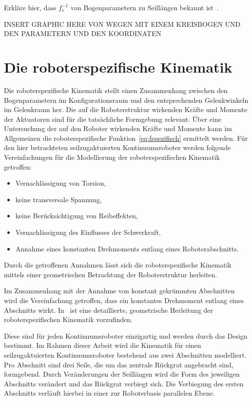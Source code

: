 Erkläre hier, dass $f^{-1}_\mathrm{s}$ von Bogenparametern zu Seillängen bekannt ist~\cite{JW06}.


INSERT GRAPHIC HERE VON WEGEN MIT EINEM KREISBOGEN UND DEN PARAMETERN UND DEN KOORDINATEN
\section{Die roboterspezifische Kinematik}
\label{sec:spezifischeKinematik}

Die roboterspezifische Kinematik stellt einen Zusammenhang zwischen den Bogenparametern im Konfigurationsraum und den entsprechenden Gelenkwinkeln im Gelenkraum her. Die auf die Roboterstruktur wirkenden Kräfte und Momente der Aktuatoren sind für die tatsächliche Formgebung relevant. Über eine Untersuchung der auf den Roboter wirkenden Kräfte und Momente kann im Allgemeinen die roboterspezifische Funktion~\eqref{eq:fspezifisch} ermittelt werden. Für den hier betrachteten seilzugaktuierten Kontinuumsroboter werden folgende Vereinfachungen für die Modellierung der roboterspezifischen Kinematik getroffen:

\begin{itemize}
\item Vernachlässigung von Torsion,
\item keine transversale Spannung,
\item keine Berücksichtigung von Reibeffekten,
\item Vernachlässigung des Einflusses der Schwerkraft,
\item Annahme eines konstanten Drehmoments entlang eines Roboterabschnitts.
\end{itemize}

Durch die getroffenen Annahmen lässt sich die roboterspezifische Kinematik mittels einer geometrischen Betrachtung der Roboterstruktur herleiten. 

Im Zusammenhang mit der Annahme von konstant gekrümmten Abschnitten wird die Vereinfachung getroffen, dass ein konstantes Drehmoment entlang eines Abschnitts wirkt. In~\cite{JW06} ist eine detaillierte, geometrische Herleitung der roboterspezifischen Kinematik vorzufinden. 

Diese sind für jeden Kontinuumsroboter einzigartig und werden durch das Design bestimmt. Im Rahmen dieser Arbeit wird die Kinematik für einen seilzugaktuierten Kontinuumsroboter bestehend aus zwei Abschnitten modelliert. Pro Abschnitt sind drei Seile, die um das zentrale Rückgrat angebracht sind, formgebend. Durch Veränderungen der Seillängen wird die Form des jeweiligen Abschnitts verändert und das Rückgrat verbiegt sich. Die Verbiegung des ersten Abschnitts verläuft hierbei in einer zur Roboterbasis parallelen Ebene. 

